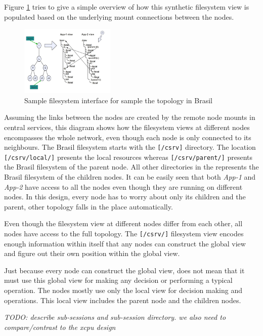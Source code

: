 Figure \ref{fig:xcpu3FSTopo} tries to give a simple overview of how this 
synthetic filesystem view is populated based on the underlying mount
connections between the nodes.

\begin{figure}[h]
  \begin{center}
    \leavevmode
      \includegraphics[height=0.3\textheight,width=0.4\textwidth]
		{./img/xcpu3FSTopo}
    \caption{Sample filesystem interface for sample the topology in Brasil}
    \label{fig:xcpu3FSTopo}
  \end{center}
\end{figure}

Assuming the links between the nodes are created by the remote node mounts in
central services, this diagram shows how the filesystem views at different
nodes encompasses the whole network, even though each node is only connected to
its neighbours. The Brasil filesystem starts with the \texttt{[/csrv]}
directory. The location \texttt{[/csrv/local/]} presents the local resources
whereas \texttt{[/csrv/parent/]} presents the Brasil filesystem of the parent
node. All other directories in the represents the Brasil filesystem of the
children nodes.  It can be easily seen that both \textit{App-1} and
\textit{App-2} have access to all the nodes even though they are running on
different nodes.  In this design, every node has to worry about only its
children and the parent, other topology falls in the place automatically.

Even though the filesystem view at different nodes differ from each other, 
all nodes have access to the full topology.  The \texttt{[/csrv/]} filesystem
view encodes enough information within itself that any nodes can construct the
global view and figure out their own position within the global view.

Just because every node can construct the global view, does not mean that it
must use this global view for making any decision or performing a typical
operation. The nodes mostly use only the local view for decision making and
operations. This local view includes the parent node and the children nodes.

\emph{TODO: describe sub-sessions and sub-session directory.  we also need
to compare/contrast to the xcpu design}
